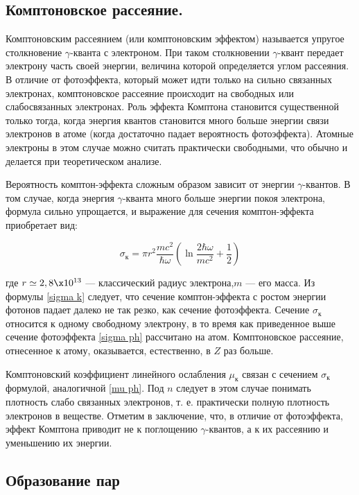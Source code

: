 \documentclass[12pt]{kiarticle}
\newcommand{\ga}{\ensuremath{\gamma}}
\begin{document}
	\subsection{Комптоновское рассеяние.} Комптоновским рассеянием (или комптоновским эффектом) называется упругое столкновение \ga-кванта с электроном. При таком столкновении \ga-квант передает электрону часть своей энергии, величина которой определяется углом рассеяния. В отличие от фотоэффекта, который может идти только на сильно связанных электронах, комптоновское рассеяние происходит на свободных или слабосвязанных электронах. Роль эффекта Комптона становится
	существенной только тогда, когда энергия квантов становится много
	больше энергии связи электронов в атоме (когда достаточно падает
	вероятность фотоэффекта). Атомные электроны в этом случае можно
	считать практически свободными, что обычно и делается при теоретическом анализе.
	
	Вероятность комптон-эффекта сложным образом зависит от энергии \ga-квантов. В том случае, когда энергия
	\ga-кванта много больше энергии покоя электрона, формула сильно
	упрощается, и выражение для сечения комптон-эффекта приобретает  вид:
	
	\begin{equation}\label{sigma k}
	\sigma_к = \pi r^2 \dfrac{mc^2}{\hbar\omega} \left( \ln{\dfrac{2\hbar\omega}{mc^2} + \dfrac{1}{2}} \right) 
	\end{equation}
	
	где $ r \simeq 2,8 \x 10^{13} $ --- классический радиус электрона,$ m $ --- его масса. Из формулы \eqref{sigma k} следует, что сечение комптон-эффекта с ростом энергии фотонов падает далеко не так резко, как сечение фотоэффекта.
	Сечение $ \sigma_к $ относится к одному свободному электрону, в то время как приведенное выше сечение фотоэффекта \eqref{sigma ph} рассчитано на атом.
	Комптоновское рассеяние, отнесенное к атому, оказывается, естественно, в $ Z $ раз больше. 
	
	Комптоновский коэффициент линейного ослабления $ \mu_к $ связан с
	сечением $ \sigma_к $ формулой, аналогичной \eqref{mu ph}. Под $ n $ следует в этом случае понимать плотность слабо связанных электронов, т. е. практически полную плотность электронов в веществе.
	Отметим в заключение, что, в отличие от фотоэффекта, эффект
	Комптона приводит не к поглощению \ga-квантов, а к их рассеянию и
	уменьшению их энергии.
	
	\subsection{Образование пар}
	
\end{document}
